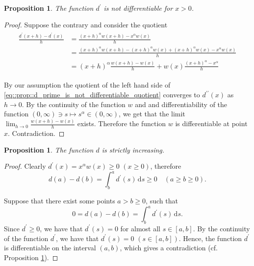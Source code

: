 \documentclass[12pt]{article}
\newcommand{\dd}{\,\mathrm{d}}
\newcommand{\dprime}{{\prime\prime}}
\renewcommand{\geq}{\geqslant}
\newcommand{\mapto}{\longmapsto}
\newcommand{\paren}[1]{\! \left( #1 \right)}
\theoremstyle{plain}
\newtheorem{proposition}[theorem]{Proposition}
\theoremstyle{definition}
\theoremstyle{remark}
\begin{document}
 
\begin{proposition} \label{prop::d_prime_is_not_differentiable}
    The function $d^\prime$ is not differentiable for $x>0$.
 \end{proposition}
\begin{proof}
    Suppose the contrary and consider the quotient
    \begin{align} \label{eq::prop::d_prime_is_not_differentiable_quotient}
      \begin{split}
          \frac{d^\prime\paren{x+h} - d^\prime\paren{x}}{h} & = \frac{\paren{x+h}^\alpha w\paren{x+h} - x^\alpha w\paren{x}}{h} \\
                                                            & = \frac{\paren{x+h}^\alpha w\paren{x+h} - \paren{x+h}^\alpha w\paren{x} + \paren{x+h}^\alpha w\paren{x} - x^\alpha w\paren{x}}{h} \\
                                                            & = \paren{x+h}^\alpha \frac{w\paren{x+h} - w\paren{x}}{h} + w\paren{x} \frac{\paren{x+h}^\alpha - x^\alpha}{h}
      \end{split}
    \end{align}

    By our assumption the quotient of the left hand side of \eqref{eq::prop::d_prime_is_not_differentiable_quotient} converges to $d^\dprime\paren{x}$ as $h \to 0$.
    By the continuity of the function $w$ and and differentiability of the function $\paren{0, \infty} \ni s \mapto s^\alpha \in \paren{0, \infty}$, we get that the limit $\lim_{h \to 0} \frac{w\paren{x+h}-w\paren{x}}{h}$ exists.
    Therefore the function $w$ is differentiable at point $x$.
    Contradiction.
\end{proof}

\begin{proposition} \label{prop::d_is_increasing}
    The function $d$ is strictly increasing.
\end{proposition}
\begin{proof}
    Clearly $d^\prime\paren{x} =x^\alpha w\paren{x} \geq 0$ $\paren{x \geq 0}$, therefore
    \begin{equation*} %
        d\paren{a} - d\paren{b} = \int^a_b d^\prime\paren{s} \dd s \geq 0 \quad \paren{a \geq b \geq 0}.
    \end{equation*}

    Suppose that there exist some points $a > b \geq 0$, such that
    \begin{equation*}
        0 = d\paren{a} - d\paren{b} = \int^a_b d^\prime\paren{s} \dd s.
    \end{equation*}
    Since $d^\prime \geq 0$, we have that $d^\prime\paren{s} = 0$ for almost all $s \in \left[a, b\right]$.
    By the continuity of the function $d^\prime$, we have that $d^\prime\paren{s} = 0$ $\paren{s \in  \left[a, b\right]}$.
    Hence, the function $d^\prime$ is differentiable on the interval $\paren{a, b}$, which gives a contradiction (cf. Proposition \ref{prop::d_prime_is_not_differentiable}).
\end{proof}
\end{document}
